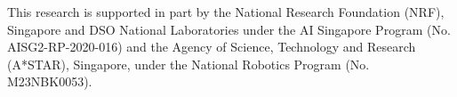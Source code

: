 \documentclass{article}
\begin{document}


\begin{ack}

This research is supported in part by the National Research Foundation (NRF), Singapore and DSO National
Laboratories under the AI Singapore Program (No. AISG2-RP-2020-016) and the Agency of Science, Technology and Research (A*STAR), Singapore, under the National Robotics Program (No. M23NBK0053).
\end{ack}






% 
% 

% 
% 
% 
\end{document}
